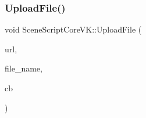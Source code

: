 \hypertarget{class_scene_script_core_v_k_a21d1e5eb863fe6c425c43c942ea5cadb}{}\label{class_scene_script_core_v_k_a21d1e5eb863fe6c425c43c942ea5cadb} 
\subsubsection{\texorpdfstring{Upload\+File()}{UploadFile()}}
{\footnotesize\ttfamily void Scene\+Script\+Core\+V\+K\+::\+Upload\+File (\begin{DoxyParamCaption}\item[{string \&in}]{url,  }\item[{string \&in}]{file\+\_\+name,  }\item[{Callback1\+I1S @}]{cb }\end{DoxyParamCaption})}

